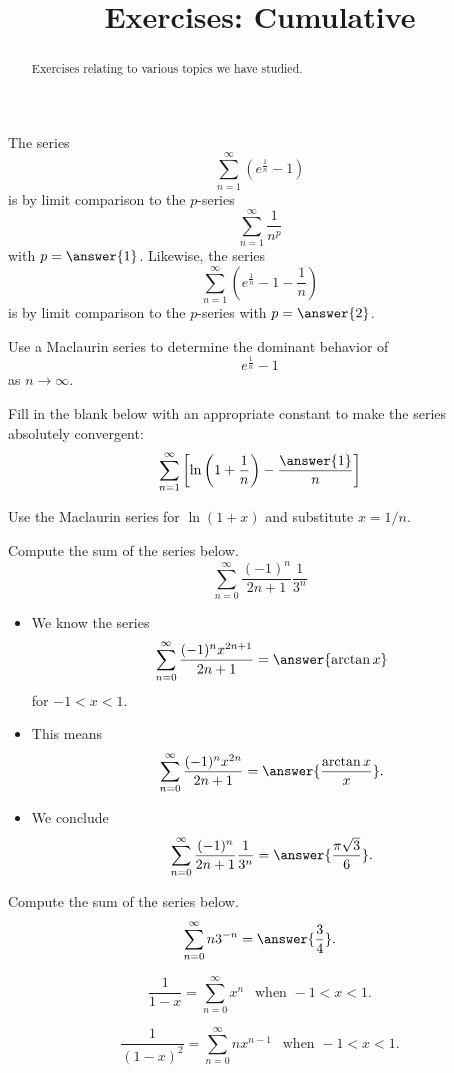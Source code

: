 \documentclass{ximera}
\title{Exercises: Cumulative}
\begin{document}
\begin{abstract}
Exercises relating to various topics we have studied.
\end{abstract}
\maketitle


\begin{exercise}
The series
\[ \sum_{n=1}^\infty \left( e^{ \frac{1}{n}} - 1 \right) \]
is  by limit comparison to the $p$-series
\[ \sum_{n=1}^\infty \frac{1}{n^p} \]
with $p = \answer{1}$.  Likewise, the
series
\[ \sum_{n=1}^\infty \left( e^{ \frac{1}{n}} - 1 - \frac{1}{n} \right) \]
is  by limit comparison to the $p$-series
with $p = \answer{2}$.
\begin{hint}
Use a Maclaurin series to determine the dominant behavior of 
\[ e^{\frac{1}{n}} - 1 \]
as $n \rightarrow \infty$.
\end{hint}
\end{exercise}

\begin{exercise}
Fill in the blank below with an appropriate constant to make the series absolutely convergent:
\[ \sum_{n=1}^\infty \left[ \ln \left( 1 + \frac{1}{n} \right) - \frac{\answer{1}}{n} \right] \]
\begin{hint}
Use the Maclaurin series for $\ln (1 + x)$ and substitute $x = 1/n$.
\end{hint}
\end{exercise}

\begin{exercise}
Compute the sum of the series below.
\[ \sum_{n=0}^\infty \frac{(-1)^n}{2n+1} \frac{1}{3^n} \]
\begin{itemize}
\item We know the series
\[ \sum_{n=0}^\infty \frac{(-1)^n x^{2n+1}}{2n+1} = \answer{\arctan x} \]
for $-1 < x < 1$. 
\item This means
\[ \sum_{n=0}^\infty \frac{(-1)^n x^{2n}}{2n+1} = \answer{\frac{\arctan x}{x}}. \]
\item We conclude
\[  \sum_{n=0}^\infty \frac{(-1)^n}{2n+1} \frac{1}{3^n} = \answer{\frac{\pi \sqrt{3}}{6}}. \]
\end{itemize}
\end{exercise}



\begin{exercise}
Compute the sum of the series below.
\[ \sum_{n=0}^\infty n 3^{-n} = \answer{\frac{3}{4}}. \]
\begin{hint}
\[ \frac{1}{1-x} = \sum_{n=0}^\infty x^n \ \ \text{ when } -1 < x < 1. \]
\end{hint}
\begin{hint}
\[ \frac{1}{(1-x)^2} = \sum_{n=0}^\infty n x^{n-1} \ \ \text{ when } -1 < x < 1. \]
\end{hint}
\end{exercise}
\end{document}

